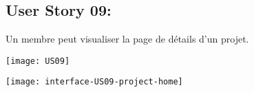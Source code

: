 \newpage{}
\subsection{User Story 09:}
Un membre peut visualiser la page de détails d'un projet.

  \begin{center}
        \texttt{[image: US09]}
  \end{center}

  \begin{center}
        \texttt{[image: interface-US09-project-home]}
  \end{center}